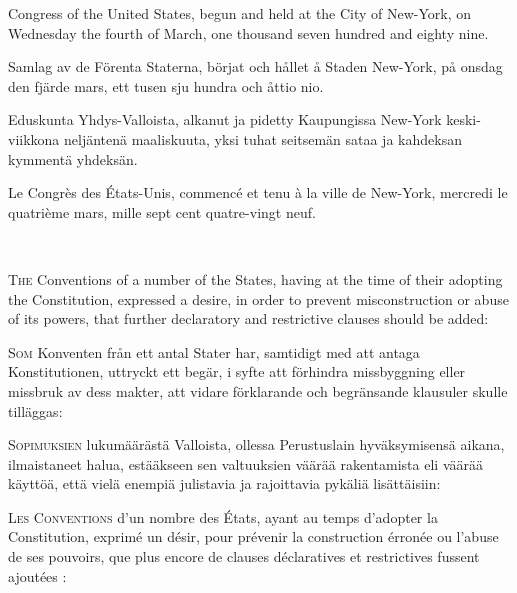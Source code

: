 \documentclass[a4,landscape,12pt]{article}
\begin{document}
\begin{minipage}[t]{0.22\textwidth}
Congress of the United States, begun and held at the City of New-York, on Wednesday the fourth of March, one thousand seven hundred and eighty nine.
\end{minipage}\textwidth
\begin{minipage}[t]{0.22\textwidth}
Samlag av de Förenta Staterna, börjat och hållet å Staden New-York, på onsdag den fjärde mars, ett tusen sju hundra och åttio nio.
\end{minipage}\textwidth
\begin{minipage}[t]{0.22\textwidth}
Eduskunta Yhdys-Valloista, alkanut ja pidetty Kaupungissa New-York keski-viikkona neljäntenä maaliskuuta, yksi tuhat seitsemän sataa ja kahdeksan kymmentä yhdeksän.
\end{minipage}\textwidth
\begin{minipage}[t]{0.22\textwidth}
Le Congrès des États-Unis, commencé et tenu à la ville de New-York, mercredi le quatrième mars, mille sept cent quatre-vingt neuf.
\end{minipage}

~

\begin{minipage}[t]{0.22\textwidth}
\textsc{The} Conventions of a number of the States, having at the time of their adopting the Constitution, expressed a desire, in order to prevent misconstruction or abuse of its powers, that further declaratory and restrictive clauses should be added:
\end{minipage}\textwidth
\begin{minipage}[t]{0.22\textwidth}
\textsc{Som} Konventen från ett antal Stater har, samtidigt med att antaga Konstitutionen, uttryckt ett begär, i syfte att förhindra missbyggning eller missbruk av dess makter, att vidare förklarande och begränsande klausuler skulle tilläggas:
\end{minipage}\textwidth
\begin{minipage}[t]{0.22\textwidth}
\textsc{Sopimuksien} lukumäärästä Valloista, ollessa Perustuslain hyväksymisensä aikana, ilmaistaneet halua, estääkseen sen valtuuksien väärää rakentamista eli väärää käyttöä, että vielä enempiä julistavia ja rajoittavia pykäliä lisättäisiin:
\end{minipage}\textwidth
\begin{minipage}[t]{0.22\textwidth}
\textsc{Les Conventions} d'un nombre des États, ayant au temps d'adopter la Constitution, exprimé un désir, pour prévenir la construction érronée ou l'abuse de ses pouvoirs, que plus encore de clauses déclaratives et restrictives fussent ajoutées :
\end{minipage}
\end{document}
